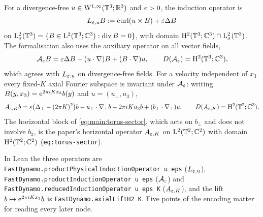 \begin{definition}
  \label{def:main:induction-operator}
  \leanok
  For a divergence-free $u\in\mathrm{W}^{1,\infty}(\mathbb{T}^3;\mathbb{R}^3)$ and $\varepsilon>0$, the
  induction operator is
  \[
    L_{\varepsilon,u}B:=\operatorname{curl}(u\times B)+\varepsilon\Delta B
  \]
  on $\mathrm{L}^2_\sigma(\mathbb{T}^3)=\{B\in\mathrm{L}^2(\mathbb{T}^3;\mathbb{C}^3):\operatorname{div} B=0\}$, with domain
  $\mathrm{H}^2(\mathbb{T}^3;\mathbb{C}^3)\cap\mathrm{L}^2_\sigma(\mathbb{T}^3)$.  The formalisation also uses the
  auxiliary operator on all vector fields,
  \[
    \mathcal{A}_\varepsilon B
    =\varepsilon\Delta B-(u\cdot\nabla)B+(B\cdot\nabla)u,
    \qquad
    D(\mathcal{A}_\varepsilon)=\mathrm{H}^2(\mathbb{T}^3;\mathbb{C}^3),
  \]
  which agrees with $L_{\varepsilon,u}$ on divergence-free fields.  For a velocity
  independent of $x_3$ every fixed-$K$ axial Fourier subspace is invariant
  under $\mathcal{A}_\varepsilon$: writing $B(y,x_3)=\mathrm{e}^{2\pi iKx_3}b(y)$ and
  $u=(u_\perp,u_3)$,
  \begin{equation}
    A_{\varepsilon,K}b
    =\varepsilon\bigl(\Delta_\perp-(2\pi K)^2\bigr)b
    -u_\perp\cdot\nabla_\perp b-2\pi iKu_3b
    +(b_\perp\cdot\nabla_\perp)u,
    \qquad
    D(A_{\varepsilon,K})=\mathrm{H}^2(\mathbb{T}^2;\mathbb{C}^3).
    \label{eq:main:torus-sector}
  \end{equation}
  The horizontal block of \eqref{eq:main:torus-sector}, which acts on $b_\perp$
  and does not involve $b_3$, is the paper's horizontal operator
  $A_{\varepsilon,K}$ on $\mathrm{L}^2(\mathbb{T}^2;\mathbb{C}^2)$ with domain $\mathrm{H}^2(\mathbb{T}^2;\mathbb{C}^2)$
  (\texttt{eq:torus-sector}).
\end{definition}

In Lean the three operators are
\texttt{FastDynamo.productPhysicalInductionOperator u eps} ($L_{\varepsilon,u}$),
\texttt{FastDynamo.productInductionOperator u eps} ($\mathcal{A}_\varepsilon$) and
\texttt{FastDynamo.reducedInductionOperator u eps K} ($A_{\varepsilon,K}$), and the
lift $b\mapsto\mathrm{e}^{2\pi iKx_3}b$ is
\texttt{FastDynamo.axialLiftH2 K}.  Five points of the encoding matter for
reading every later node.

